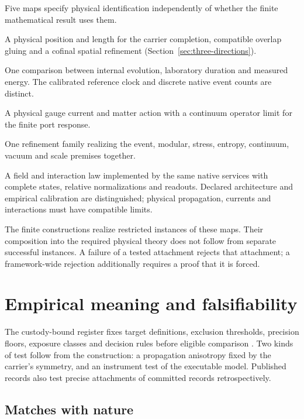 \documentclass[11pt]{article}
\theoremstyle{definition}
\theoremstyle{remark}
\begin{document}
Five maps specify physical identification independently of whether the
finite mathematical result uses them.
\begin{description}[leftmargin=2.6em]
\item[(M1) Position and scale.] A physical position and length for the carrier
completion, compatible overlap gluing and a cofinal spatial refinement
(Section~\ref{sec:three-directions}).
\item[(M2) Clock and energy calibration.] One comparison between internal
evolution, laboratory duration and measured energy. The calibrated reference
clock and discrete native event counts are distinct.
\item[(M3) Laboratory current.] A physical gauge current and matter action
with a continuum operator limit for the finite port response.
\item[(M4) One common physical tower.] One refinement family realizing the
event, modular, stress, entropy, continuum, vacuum and scale premises together.
\item[(M5) An implemented and matched action.] A field and interaction law
implemented by the same native services with complete states, relative
normalizations and readouts. Declared architecture and empirical calibration
are distinguished; physical propagation, currents and interactions must have
compatible limits.
\end{description}

The finite constructions realize restricted instances of these maps. Their
composition into the required physical theory does not follow from separate
successful instances. A failure of a tested attachment rejects that attachment;
a framework-wide rejection additionally requires a proof that it is forced.


\section{Empirical meaning and falsifiability}
\label{sec:empirical}

The custody-bound register fixes target definitions, exclusion thresholds,
precision floors, exposure classes and decision rules before eligible
comparison \cite{ophregister}. Two kinds of test follow from the
construction: a propagation anisotropy fixed by the carrier's symmetry, and
an instrument test of the executable model. Published records
also test precise attachments of committed records retrospectively.

\subsection{Matches with nature}
\label{sec:matches}
\end{document}
